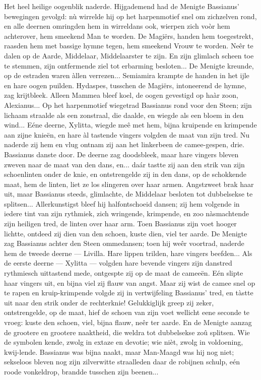 \documentclass[a4paper, 12pt, oneside, dutch]{article}
\begin{document}
Het heel heilige oogenblik naderde. Hijgademend had de Menigte Bassianus' bewegingen gevolgd: nù wirrelde hij op het harpenmotief snel om zichzelven rond, en alle deernen omringden hem in wirreldans ook, wierpen zich voòr hem achterover, hem smeekend Man te worden. De Magiërs, handen hem toegestrekt, raasden hem met bassige hymne tegen, hem smeekend Vrouw te worden. Neêr te dalen op de Aarde, Middelaar, Middelaarster te zijn. En zijn glimlach scheen toe te stemmen, zijn ontfermende ziel tot erbarming besloten... De Menigte kreunde, op de estraden waren àllen verrezen... Semiamira krampte de handen in het ijle en hare oogen puilden. Hydaspes, tusschen de Magiërs, intoneerend de hymne, zag krijtbleek. Alleen Mammea bleef koel, de oogen gevestigd op haàr zoon, Alexianus... Op het harpenmotief wiegetrad Bassianus rond voor den Steen; zijn lichaam straalde als een zonstraal, die daalde, en wiegde als een bloem in den wind... Eéne deerne, Xylitta, wiegde meê met hem, bijna kruipende en krimpende aan zijne knieën, en hare àl tastende vingers volgden de maat van zijn tred. Nu naderde zij hem en vlug ontnam zij aan het linkerbeen de camee-gespen, drie. Bassianus danste door. De deerne zag doodsbleek, maar hare vingers bleven zweven naar de maat van den dans, en... daár tastte zij aan den strik van zijn schoenlinten onder de knie, en ontstrengelde zij in den dans, op de schokkende maat, hem de linten, liet ze los slingeren over haar armen. Angstzweet brak haar uit, maar Bassianus steeds, glimlachte, de Middelaar besloten tot dubbelsekse te splitsen... Allerkunstigst bleef hij halfontschoeid dansen; zij hem volgende in iedere tint van zijn rythmiek, zich wringende, krimpende, en zoo nàsmachtende zijn heiligen tred, de linten over haar arm. Toen Bassianus zijn voet hooger lichtte, ontdeed zij dien van den schoen, kuste dien, viel ter aarde. De Menigte zag Bassianus achter den Steen ommedansen; toen hij weêr voortrad, naderde hem de tweede deerne --- Livilla. Hare lippen trilden, hare vingers beefden... Als de eerste deerne --- Xylitta --- volgden hare bevende vingers zijn danstred rythmiesch uittastend mede, ontgespte zij op de maat de cameeën. Eén slipte haar vingers uit, en bijna viel zij flauw van angst. Maar zij wist de camee snel op te rapen en kruip-krimpende volgde zij in vertwijfeling Bassianus' tred, en tàstte uit naar den strik onder de rechterknie! Gelukkiglijk greep zij zeker, ontstrengelde, op de maat, hief de schoen van zijn voet wellicht eene seconde te vroeg: kuste den schoen, viel, bijna flauw, neêr ter aarde. En de Menigte aanzag de grootere en grootere naaktheid, die weldra tot dubbelsekse zoû splitsen. Wie de symbolen kende, zwolg in extaze en devotie; wie nièt, zwolg in voldoening, kwij-lende. Bassianus was bijna naakt, maar Man-Maagd was hij nog niet; sekseloos bleven nog zijn zilverwitte straalleden daar de robijnen schulp, eén roode vonkeldrop, brandde tusschen zijn beenen...
\end{document}
